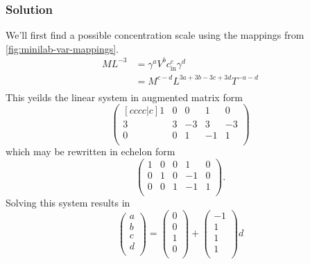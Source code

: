 \documentclass[12pt,twoside]{article}
\begin{document}
\subsubsection*{Solution}
We'll first find a possible concentration scale using the mappings from
\cref{fig:minilab-var-mappings}.
\begin{equation*}
  \begin{aligned}
    ML^{-3} &= \gamma^aV^bc_{\text{in}}^c\gamma^d \\
    &= M^{c-d}L^{3a+3b-3c+3d}T^{-a-d} \\
  \end{aligned}
\end{equation*}
This yeilds the linear system in augmented matrix form
\begin{equation*}
  \begin{pmatrix}[cccc|c]
    1 & 0 & 0 & 1 & 0 \\
    3 & 3 & -3 & 3 & -3 \\
    0 & 0 & 1 & -1 & 1 \\
  \end{pmatrix}
\end{equation*}
which may be rewritten in echelon form
\begin{equation*}
  \begin{pmatrix}
    1 & 0 & 0 & 1 & 0 \\
    0 & 1 & 0 & -1 & 0 \\
    0 & 0 & 1 & -1 & 1 \\
  \end{pmatrix}.
\end{equation*}
Solving this system results in
\begin{equation*}
  \begin{pmatrix}
    a \\ b \\ c \\ d \\
  \end{pmatrix} =
  \begin{pmatrix}
    0 \\ 0 \\ 1 \\ 0 \\
  \end{pmatrix} +
  \begin{pmatrix}
    -1 \\ 1 \\ 1 \\ 1 \\
  \end{pmatrix}d
\end{equation*}
\end{document}

